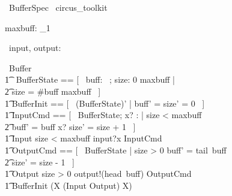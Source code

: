 \documentclass{article}
\begin{document}
\begin{zsection}
	\SECTION\ BufferSpec \parents\ circus\_toolkit
\end{zsection}

\begin{axdef}
 maxbuff: \nat_1
\end{axdef}

\begin{circus}
	\circchannel\ input, output: \nat \\
\end{circus}

\begin{circus}
	\circprocess\ Buffer \circdef \circbegin \\
    	\t1 \circstate\ BufferState == [~ buff: \seq~\nat; size: 0 \upto maxbuff | \\
            \t2 size = \#buff \leq maxbuff ~] \\
    	\t1	BufferInit == [~ (BufferState)' | buff' = \langle\rangle \land size' = 0 ~] \\
		\t1 InputCmd == [~ \Delta BufferState; x? : \nat | size < maxbuff \land \\
            \t2 buff' = buff \cat \langle x? \rangle \land size' = size + 1 ~] \\
        \t1 Input \circdef \lcircguard size < maxbuff \rcircguard \circguard input?x \then \lschexpract InputCmd \rschexpract \\
		\t1 OutputCmd == [~ \Delta BufferState | size > 0 \land buff' = tail~buff \land \\
            \t2 size' = size - 1 ~] \\
        \t1 Output \circdef \lcircguard size > 0 \rcircguard \circguard output!(head~buff) \then \lschexpract OutputCmd \rschexpract \\
	\t1 \circspot \lschexpract BufferInit \rschexpract \circseq (\circmu X \circspot (Input \extchoice Output) \circseq X) \\
	\circend
\end{circus}
\end{document}
